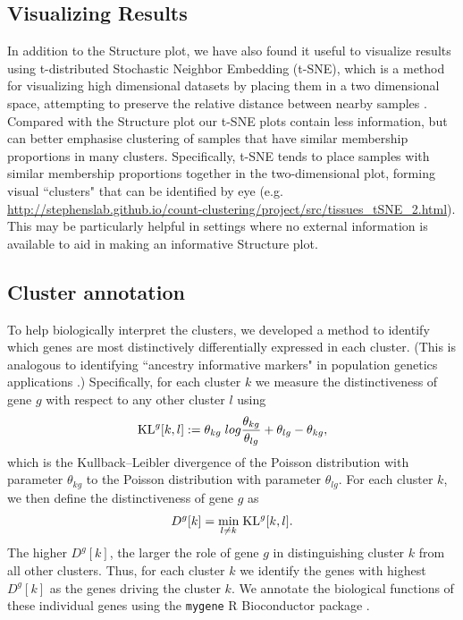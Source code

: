 \documentclass[10pt,letterpaper]{article}
\begin{document}
\subsection*{Visualizing Results}

In addition to the Structure plot, we have also found it useful to visualize results using t-distributed Stochastic Neighbor Embedding (t-SNE), which is a method for visualizing high dimensional datasets by placing them in a two dimensional space, attempting to preserve the relative distance between nearby samples \cite{Maaten2014,Maaten2008}. Compared with the Structure plot our t-SNE plots contain less information, but can better emphasise clustering of samples that have similar membership proportions in many clusters. Specifically, t-SNE tends to place samples with similar membership proportions together in the two-dimensional plot, forming visual ``clusters" that can be identified by eye (e.g. \url{http://stephenslab.github.io/count-clustering/project/src/tissues_tSNE_2.html}). This may be particularly helpful in settings where no external information is available to aid in making an informative Structure plot.


\subsection*{Cluster annotation}

To help biologically interpret the clusters, we developed a method to identify which genes are most distinctively differentially expressed in each cluster.
(This is analogous to identifying ``ancestry informative markers" in population genetics applications \cite{Rosenberg2005}.)
 Specifically, for each cluster $k$ we measure the distinctiveness of gene $g$ with respect to any other cluster $l$ using
\begin{equation}
\text{KL}^{g} [k,l] : = \theta_{kg} \; log \frac{\theta_{kg}}{\theta_{lg}} + \theta_{lg} - \theta_{kg},
\end{equation}
which is the Kullback--Leibler divergence of the Poisson distribution with parameter $\theta_{kg}$ to the Poisson distribution with parameter $\theta_{lg}$.
For each cluster $k$, we then define the distinctiveness of gene $g$ as
\begin{equation}
D^{g}[k] = \underset{l \neq k}{\min} \; \text{KL}^{g} [k, l].
\end{equation}
The higher $D^g[k]$, the larger the role of gene $g$ in distinguishing cluster $k$ from all other clusters.
Thus, for each cluster $k$ we identify the genes with highest $D^{g}[k]$ as the genes driving the cluster $k$.
We annotate the biological functions of these individual genes using the {\tt mygene} R Bioconductor package  \cite{Thompson2014}.
\end{document}

